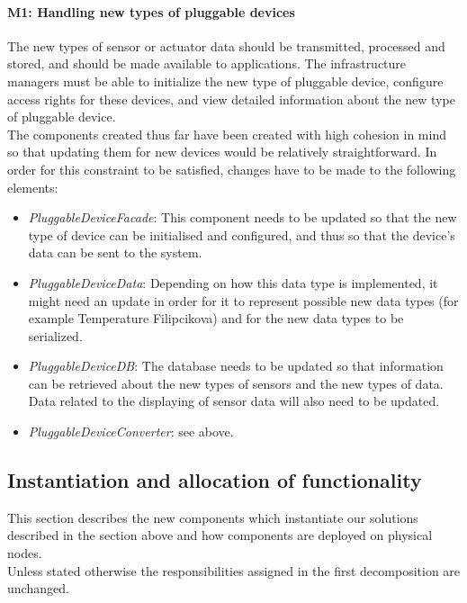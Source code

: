     \paragraph{M1: Handling new types of pluggable devices}
        The new types of sensor or actuator data should be transmitted,
        processed and stored, and should be made available to applications.
        The infrastructure managers must be able to initialize the new type
        of pluggable device, configure access rights for these devices, and
        view detailed information about the new type of pluggable device. \\
        The components created thus far have been created with high cohesion in
        mind so that updating them for new devices would be relatively straightforward.
        In order for this constraint to be satisfied, changes have to be made to
        the following elements:
        \begin{itemize}
            \item \emph{PluggableDeviceFacade}: This component needs to be updated
                  so that the new type of device can be initialised and configured,
                  and thus so that the device's data can be sent to the system.
            \item \emph{PluggableDeviceData}: Depending on how this data type
                  is implemented, it might need an update in order for it
                  to represent possible new data types (for example
                  Temperature Filipcikova) and for the new data types to be
                  serialized.
            \item \emph{PluggableDeviceDB}: The database needs to be updated
                  so that information can be retrieved about the new types
                  of sensors and the new types of data. Data related to the
                  displaying of sensor data will also need to be updated.
            \item \emph{PluggableDeviceConverter}: see above.
        \end{itemize}


\subsection{Instantiation and allocation of functionality}
    This section describes the new components which instantiate our solutions described
    in the section above and how components are deployed on physical nodes. \\
    Unless stated otherwise the responsibilities assigned in the first decomposition are unchanged.

